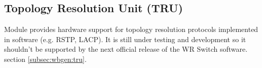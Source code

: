\subsection{Topology Resolution Unit (TRU)}
\label{sec:tru}


Module provides hardware support for topology resolution protocols implemented
in software (e.g. RSTP, LACP). It is still under testing and development so it
shouldn't be supported by the next official release of the WR Switch software.\\

 section \ref{subsec:wbgen:tru}.
